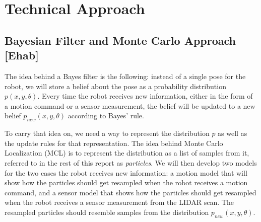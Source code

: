 \documentclass[11pt,twocolumn]{article}
\begin{document}

\section{Technical Approach}

\subsection{Bayesian Filter and Monte Carlo Approach [Ehab]}

The idea behind a Bayes filter is the following: instead of a single pose for the robot, we will store a belief about the pose as a probability distribution $p(x,y,\theta)$. Every time the robot receives new information, either in the form of a motion command or a sensor measurement, the belief will be updated to a new belief $p_{new}(x,y,\theta)$ according to Bayes' rule.

To carry that idea on, we need a way to represent the distribution $p$ as well as the update rules for that representation. The idea behind Monte Carlo Localization (MCL) is to represent the distribution as a list of samples from it, referred to in the rest of this report as \textit{particles}. We will then develop two models for the two cases the robot receives new information: a motion model that will show how the particles should get resampled when the robot receives a motion command, and a sensor model that shows how the particles should get resampled when the robot receives a sensor measurement from the LIDAR scan. The resampled particles should resemble samples from the distribution $p_{new}(x,y,\theta)$.
\end{document}
